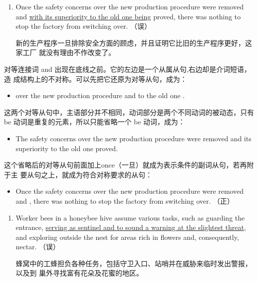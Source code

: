 \begin{enumerate}[resume]
\item Once the safety concerns over the new production procedure were removed
  and \ul{with its superiority to the old one being} proved, there was nothing to
  stop the factory from switching over. （误）

  新的生产程序一旦排除安全方面的顾虑，并且证明它比旧的生产程序更好，这家工厂
  就没有理由不作改变了。
\end{enumerate}

对等连接词 and 出现在底线之前。它的左边是一个从属从句,右边却是介词短语，造
成结构上的不对称。可以先把它还原为对等从句，成为：
\begin{itemize}
\item {} over the new production procedure
   and  to the old one
  .
\end{itemize}

这两个对等从句中，主语部分并不相同，动词部分是两个不同动词的被动态，只有
be 动词是重复的元素，所以只能省略一个 be 动词，成为：
\begin{itemize}
\item The safety concerns over the new production procedure were removed and
  its superiority to the old one proved.
\end{itemize}

这个省略后的对等从句前面加上once（一旦）就成为表示条件的副词从句，若再附于主
要从句之上，就成为符合对称要求的从句：
\begin{mybox}
\begin{itemize}
\item Once the safety concerns over the new production procedure were removed
  and , there was nothing to stop the
  factory from switching over. （正）
\end{itemize}
\end{mybox}

\begin{enumerate}[resume]
\item Worker bees in a honeybee hive assume various tasks, such as guarding the
  entrance, \ul{serving as sentinel and to sound a warning at the slightest
  threat}, and exploring outside the nest for areas rich in flowers and,
  consequently, nectar. （误）

  蜂窝中的工蜂担负各种任务，包括守卫入口、站哨并在威胁来临时发出警报，以及到
  巢外寻找富有花朵及花蜜的地区。
\end{enumerate}

